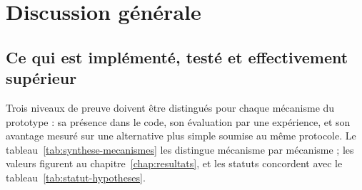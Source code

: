 \chapter{Discussion générale}

\section{Ce qui est implémenté, testé et effectivement supérieur}
\label{sec:synthese-mecanismes}

Trois niveaux de preuve doivent être distingués pour chaque mécanisme du prototype : sa
présence dans le code, son évaluation par une expérience, et son avantage mesuré sur une
alternative plus simple soumise au même protocole. Le tableau~\ref{tab:synthese-mecanismes}
les distingue mécanisme par mécanisme ; les valeurs figurent au
chapitre~\ref{chap:resultats}, et les statuts concordent avec le
tableau~\ref{tab:statut-hypotheses}.

